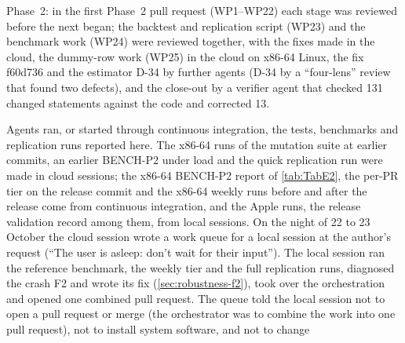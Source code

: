 \begin{description}
Phase~2: in the first Phase~2 pull request (WP1--WP22) each stage was reviewed before the next
began; the backtest and replication script (WP23) and the benchmark work (WP24) were reviewed
together, with the fixes made in the cloud, the dummy-row work (WP25) in the cloud on x86-64 Linux,
the fix f60d736 and the estimator D-34 by further agents (D-34 by a ``four-lens'' review that found
two defects), and the close-out by a verifier agent that checked 131 changed statements against the
code and corrected 13.
\item[Runs.] Agents ran, or started through continuous integration, the tests, benchmarks and
replication runs reported here. The x86-64 runs of the mutation suite at earlier commits, an
earlier BENCH-P2 under load and the quick replication run were made in cloud sessions; the x86-64
BENCH-P2 report of \cref{tab:TabE2}, the per-PR tier on the release commit and the x86-64 weekly runs
before and after the release come from continuous integration, and the Apple runs, the release validation record among them, from local sessions.
On the night of 22 to 23 October the cloud session wrote a work queue for a local session at the
author's request (``The user is asleep: don't wait for their input''). The local session ran the
reference benchmark, the weekly tier and the full replication runs, diagnosed the crash F2 and
wrote its fix (\cref{sec:robustness-f2}), took over the orchestration and opened one combined pull
request. The queue told the local session not to open a pull request or merge (the orchestrator was
to combine the work into one pull request), not to install system software, and not to change

\end{description}
